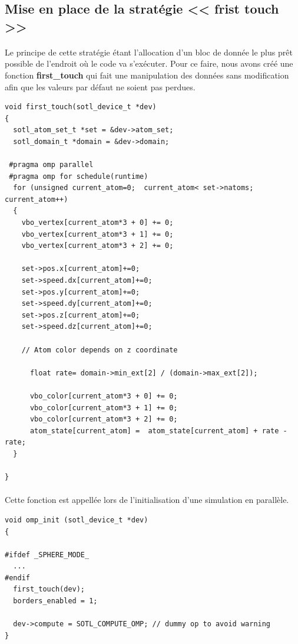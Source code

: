 \documentclass[a4paper,11pt]{report}
\begin{document}
\subsection{Mise en place de la stratégie \textbf{<< frist touch >>}}
\paragraph{}
Le principe de  cette stratégie étant l'allocation d'un bloc de donnée le plus prêt possible de l'endroit où le code va s'exécuter. Pour ce faire, nous avons créé une fonction \textbf{first\_touch} qui fait une manipulation des données sans modification afin que les valeurs par défaut ne soient pas perdues. 
\newline
\begin{lstlisting}[style=CStyle]
void first_touch(sotl_device_t *dev)
{
  sotl_atom_set_t *set = &dev->atom_set;
  sotl_domain_t *domain = &dev->domain;

 #pragma omp parallel
 #pragma omp for schedule(runtime)
  for (unsigned current_atom=0;  current_atom< set->natoms; current_atom++)
  {
    vbo_vertex[current_atom*3 + 0] += 0;
    vbo_vertex[current_atom*3 + 1] += 0;
    vbo_vertex[current_atom*3 + 2] += 0;

    set->pos.x[current_atom]+=0;
    set->speed.dx[current_atom]+=0;
    set->pos.y[current_atom]+=0;
    set->speed.dy[current_atom]+=0;
    set->pos.z[current_atom]+=0;
    set->speed.dz[current_atom]+=0;

    // Atom color depends on z coordinate
    
      float rate= domain->min_ext[2] / (domain->max_ext[2]);
      
      vbo_color[current_atom*3 + 0] += 0;
      vbo_color[current_atom*3 + 1] += 0;
      vbo_color[current_atom*3 + 2] += 0;
      atom_state[current_atom] =  atom_state[current_atom] + rate - rate;
  }

}

\end{lstlisting}
\paragraph{}
Cette fonction est appellée lors de l'initialisation d'une simulation en parallèle. 
\newline

\begin{lstlisting}[style=CStyle]
void omp_init (sotl_device_t *dev)
{

#ifdef _SPHERE_MODE_
  ...
#endif
  first_touch(dev);
  borders_enabled = 1;

  dev->compute = SOTL_COMPUTE_OMP; // dummy op to avoid warning
}
\end{lstlisting}
\end{document}
